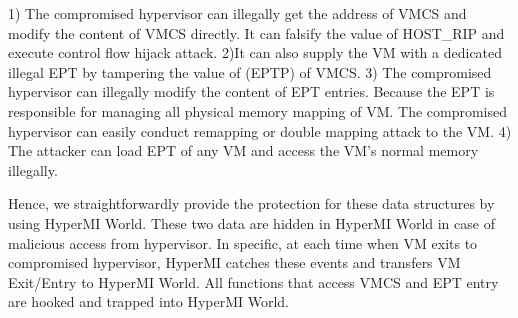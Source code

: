 \documentclass[conference]{IEEEtran}
\begin{document}
1) The compromised hypervisor can illegally get the address of VMCS and modify the content of VMCS directly. It can falsify the value of HOST\_RIP and execute control flow hijack attack.
2)It can also supply the VM with a dedicated illegal EPT by tampering the value of (EPTP) of VMCS. 
3) The compromised hypervisor can illegally modify the content of EPT entries. Because the EPT is responsible for managing all physical memory mapping of VM. The compromised hypervisor can easily conduct remapping or double mapping attack to the VM.
4) The attacker can load EPT of any VM and access the VM's normal memory illegally.

Hence, we straightforwardly provide the protection for these data structures by using HyperMI World. These two data are hidden in HyperMI World in case of malicious access from hypervisor. In specific, at each time when VM exits to compromised hypervisor, HyperMI catches these events and transfers VM Exit/Entry to HyperMI World. All functions that access VMCS and EPT entry are hooked and trapped into HyperMI World.



%
\end{document}
